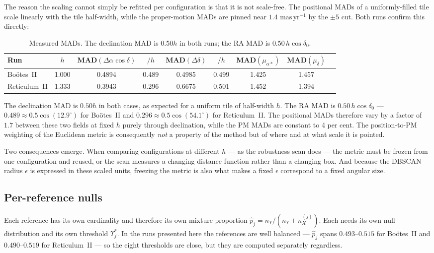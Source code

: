 \documentclass[11pt,a4paper]{article}
\newcommand{\unit}[1]{\ensuremath{\,\mathrm{#1}}}
\newcommand{\masyr}{\unit{mas\,yr^{-1}}}
\newcommand{\Ups}{\Upsilon}                  %
\newcommand{\phat}{\hat{p}}                  %
\newcommand{\Ups}{\Upsilon}
\newcommand{\phat}{\hat{p}}
\newcommand{\masyr}{\mathrm{mas\,yr^{-1}}}
\newcommand{\dg}{^{\circ}}
\begin{document}
The reason the scaling cannot simply be refitted per configuration is that it is not scale-free.
The positional MADs of a uniformly-filled tile scale linearly with the tile half-width, while the
proper-motion MADs are pinned near $1.4\,\masyr$ by the $\pm 5$ cut. Both runs confirm this
directly:

\begin{table}[h]
\centering\small
\caption{Measured MADs. The declination MAD is $0.50h$ in both runs; the RA MAD is
$0.50\,h\cos\delta_0$.}
\begin{tabular}{@{}lcccccccc@{}}
\toprule
Run & $h$ & MAD$(\Delta\alpha\cos\delta)$ & $/h$ & MAD$(\Delta\delta)$ & $/h$ &
MAD$(\mu_{\alpha*})$ & MAD$(\mu_\delta)$\\
\midrule
Bo\"otes~II   & 1.000 & 0.4894 & 0.489 & 0.4985 & 0.499 & 1.425 & 1.457\\
Reticulum~II  & 1.333 & 0.3943 & 0.296 & 0.6675 & 0.501 & 1.452 & 1.394\\
\bottomrule
\end{tabular}
\end{table}

The declination MAD is $0.50h$ in both cases, as expected for a uniform tile of half-width $h$.
The RA MAD is $0.50\,h\cos\delta_0$ --- $0.489 \approx 0.5\cos(12.9\dg)$ for Bo\"otes~II and
$0.296 \approx 0.5\cos(54.1\dg)$ for Reticulum~II. The positional MADs therefore vary by a factor
of $1.7$ between these two fields at fixed $h$ purely through declination, while the PM MADs are
constant to 4 per cent. The position-to-PM weighting of the Euclidean metric is consequently
\emph{not} a property of the method but of where and at what scale it is pointed.

Two consequences emerge. When comparing configurations at different $h$ --- as the robustness scan does
--- the metric must be frozen from one configuration and reused, or the scan measures a changing
distance function rather than a changing box. And because the DBSCAN radius $\epsilon$ is expressed
in these scaled units, freezing the metric is also what makes a fixed $\epsilon$ correspond to a
fixed angular size.

\subsection{Per-reference nulls}
\label{sec:perref}

Each reference has its own cardinality and therefore its own mixture proportion
$\phat_j = n_Y/(n_Y + n_X^{(j)})$. Each needs its own null distribution and its own threshold
$\Ups^*_j$. In the runs presented here the references are well balanced --- $\phat_j$ spans
$0.493$--$0.515$ for Bo\"otes~II and $0.490$--$0.519$ for Reticulum~II --- so the eight thresholds
are close, but they are computed separately regardless.
\end{document}
